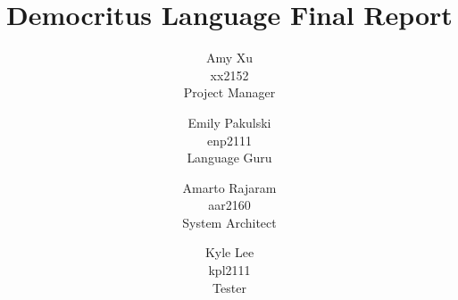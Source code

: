 \documentclass{report}
\author{
  Amy Xu \\ \small{xx2152} \\ \small{Project Manager}
  \and Emily Pakulski \\ \small{enp2111} \\ \small{Language Guru}
  \and Amarto Rajaram \\ \small{aar2160}  \\ \small{System Architect}
  \and Kyle Lee\\ \small{kpl2111} \\ \small{Tester}
}
\title{Democritus Language Final Report}
\begin{document}
	\maketitle
	\tableofcontents
	\pagebreak
  
  
  
  
  
  
  
  
  
\end{document}
